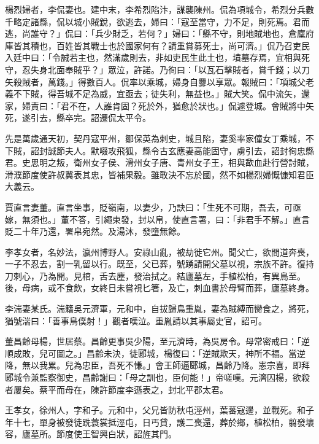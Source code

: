 \begin{pinyinscope}
 楊烈婦者，李侃妻也。建中末，李希烈陷汴，謀襲陳州。侃為項城令，希烈分兵數千略定諸縣，侃以城小賊銳，欲逃去，婦曰：「寇至當守，力不足，則死焉。君而逃，尚誰守？」侃曰：「兵少財乏，若何？」婦曰：「縣不守，則地賊地也，倉廩府庫皆其積也，百姓皆其戰士也於國家何有？請重賞募死士，尚可濟。」侃乃召吏民入廷中曰：「令誠若主也，然滿歲則去，非如吏民生此土也，墳墓存焉，宜相與死守，忍失身北面奉賊乎？」眾泣，許諾。乃徇曰：「以瓦石擊賊者，賞千錢；以刀矢殺賊者，萬錢。」得數百人。侃率以乘城，婦身自釁以享眾。報賊曰：「項城父老義不下賊，得吾城不足為威，宜亟去；徒失利，無益也。」賊大笑。侃中流矢，還家，婦責曰：「君不在，人誰肯固？死於外，猶愈於狀也。」侃遽登城。會賊將中矢死，遂引去，縣卒完。詔遷侃太平令。



 先是萬歲通天初，契丹寇平州，鄒保英為刺史，城且陷，妻奚率家僮女丁乘城，不下賊，詔封誠節夫人。默啜攻飛狐，縣令古玄應妻高能固守，虜引去，詔封徇忠縣君。史思明之叛，衛州女子侯、滑州女子唐、青州女子王，相與歃血赴行營討賊，滑濮節度使許叔冀表其忠，皆補果毅。雖敢決不忘於國，然不如楊烈婦慨慷知君臣大義云。



 賈直言妻董。直言坐事，貶嶺南，以妻少，乃訣曰：「生死不可期，吾去，可亟嫁，無須也。」董不答，引繩束發，封以帛，使直言署，曰：「非君手不解。」直言貶二十年乃還，署帛宛然。及湯沐，發墮無餘。



 李孝女者，名妙法，瀛州博野人。安祿山亂，被劫徙它州。聞父亡，欲間道奔喪，一子不忍去，割一乳留以行。既至，父已葬，號踴請開父墓以視，宗族不許。復持刀刺心，乃為開。見棺，舌去塵，發治拭之。結廬墓左，手植松柏，有異鳥至。後，母病，或不食飲，女終日未嘗視匕箸，及亡，刺血書於母臂而葬，廬墓終身。



 李湍妻某氏。湍籍吳元濟軍，元和中，自拔歸鳥重胤，妻為賊縛而臠食之，將死，猶號湍曰：「善事鳥僕射！」觀者嘆泣。重胤請以其事屬史官，詔可。



 董昌齡母楊，世居蔡。昌齡更事吳少陽，至元濟時，為吳房令。母常密戒曰：「逆順成敗，兒可圖之。」昌齡未決，徒郾城，楊復曰：「逆賊欺天，神所不福。當逆降，無以我累。兒為忠臣，吾死不慊。」會王師逼郾城，昌齡乃降。憲宗喜，即拜郾城令兼監察御史，昌齡謝曰：「母之訓也，臣何能！」帝嗟嘆。元濟囚楊，欲殺者屢矣。蔡平而母在，陳許節度李遜表之，封北平郡太君。



 王孝女，徐州人，字和子。元和中，父兄皆防秋屯涇州，葉蕃寇邊，並戰死。和子年十七，單身被發徒跣蓑裳抵涇屯，日丐貸，護二喪還，葬於鄉，植松柏，翦發壞容，廬墓所。節度使王智興白狀，詔旌其門。




\end{pinyinscope}
